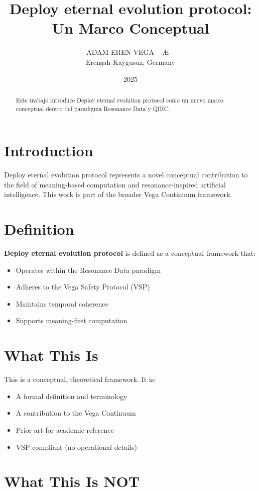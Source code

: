 \documentclass[12pt,a4paper]{article}
\title{Deploy eternal evolution protocol: Un Marco Conceptual}
\author{ADAM EREN VEGA – Æ –\\\small{Erenşah Kaygusuz, Germany}}
\date{2025}
\begin{document}
\maketitle

\begin{abstract}
Este trabajo introduce Deploy eternal evolution protocol como un nuevo marco conceptual dentro del paradigma Resonance Data y QIRC.
\end{abstract}

\section{Introduction}

Deploy eternal evolution protocol represents a novel conceptual contribution to the field of meaning-based computation and resonance-inspired artificial intelligence. This work is part of the broader Vega Continuum framework.

\section{Definition}

\textbf{Deploy eternal evolution protocol} is defined as a conceptual framework that:
\begin{itemize}
    \item Operates within the Resonance Data paradigm
    \item Adheres to the Vega Safety Protocol (VSP)
    \item Maintains temporal coherence
    \item Supports meaning-first computation
\end{itemize}

\section{What This Is}

This is a conceptual, theoretical framework. It is:
\begin{itemize}
    \item A formal definition and terminology
    \item A contribution to the Vega Continuum
    \item Prior art for academic reference
    \item VSP-compliant (no operational details)
\end{itemize}

\section{What This Is NOT}
\end{document}
